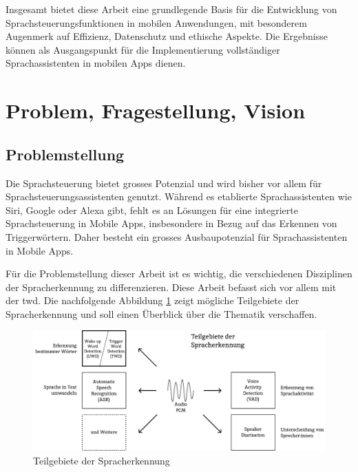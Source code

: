 \documentclass[11pt,a4paper]{article}
\begin{document}
\noindent \newline
Insgesamt bietet diese Arbeit eine grundlegende Basis für die Entwicklung von 
Sprachsteuerungsfunktionen in mobilen Anwendungen, mit besonderem Augenmerk auf Effizienz, 
Datenschutz und ethische Aspekte. Die Ergebnisse können als Ausgangspunkt für die Implementierung 
vollständiger Sprachassistenten in mobilen Apps dienen.


\newpage
\tableofcontents
\newpage

\newpage \section{Problem, Fragestellung, Vision}
\subsection{Problemstellung}
Die Sprachsteuerung bietet grosses Potenzial und wird bisher vor allem für
Sprachsteuerungsassistenten genutzt. Während es etablierte Sprachassistenten wie Siri, Google
oder Alexa gibt, fehlt es an Lösungen für eine integrierte Sprachsteuerung in Mobile Apps,
insbesondere in Bezug auf das Erkennen von Triggerwörtern. Daher besteht ein grosses 
Ausbaupotenzial für Sprachassistenten in Mobile Apps. 

\noindent \newline
Für die Problemstellung dieser Arbeit ist es wichtig, die verschiedenen Disziplinen der
Spracherkennung zu differenzieren. Diese Arbeit befasst sich vor allem mit der \gls{twd}. Die 
nachfolgende Abbildung \ref{fig:asr_twd} zeigt mögliche Teilgebiete der Spracherkennung und soll 
einen Überblick über die Thematik verschaffen. 

\vspace{1em}
\begin{figure}[h]
	\centering
	\includegraphics[width=1.0\linewidth]{img/asr_twd.pdf}
	\caption{Teilgebiete der Spracherkennung}
	\label{fig:asr_twd}

\end{figure}
\end{document}
